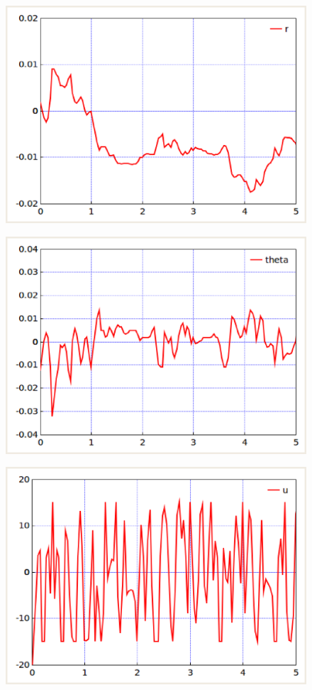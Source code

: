 \documentclass[10pt,a4paper,titlepage]{jreport} %
\begin{document}
\begin{figure}[H] %
  \centering
  \includegraphics[width=0.6\linewidth]{7700rSrc.eps} %
\end{figure}

\begin{figure}[H] %
  \centering
  \includegraphics[width=0.6\linewidth]{7700thSrc.eps} %
\end{figure}

\begin{figure}[H] %
  \centering
  \includegraphics[width=0.6\linewidth]{7700uSrc.eps} %
\end{figure}
\end{document}
